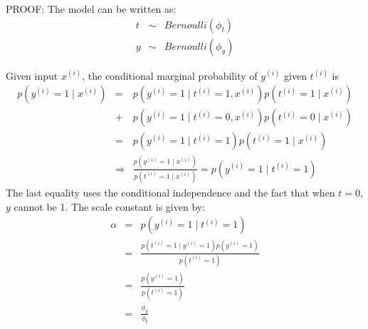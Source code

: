 \begin{answer}

PROOF: The model can be written as:
\begin{eqnarray*}
    t &\sim& Bernoulli(\phi_t) \\
    y &\sim& Bernoulli(\phi_y)
\end{eqnarray*}

Given input $x^{(i)}$, the conditional marginal probability of $y^{(i)}$ given $t^{(i)}$ is
\begin{eqnarray*}
p(y^{(i)} = 1\mid x^{(i)}) 
    &=& p(y^{(i)} = 1 \mid t^{(i)} = 1, x^{(i)}) p(t^{(i)} = 1\mid x^{(i)}) \\
    &+& p(y^{(i)} = 1 \mid t^{(i)} = 0, x^{(i)}) p(t^{(i)} = 0\mid x^{(i)}) \\
    &=& p(y^{(i)} = 1 \mid t^{(i)} = 1) p(t^{(i)} = 1\mid x^{(i)}) \\
    &\Rightarrow& \frac{p(y^{(i)} = 1\mid x^{(i)}) } {p(t^{(i)} = 1\mid x^{(i)})} = p(y^{(i)} = 1 \mid t^{(i)} = 1)
\end{eqnarray*}
The last equality uses the conditional independence and the fact that when $t=0$, $y$ cannot be 1. The scale constant
is given by:
\begin{eqnarray*}
\alpha 
    &=& p(y^{(i)} = 1 \mid t^{(i)} = 1) \\
    &=& \frac{p(t^{(i)} = 1 \mid y^{(i)} = 1) p(y^{(i)} = 1)}{p(t^{(i)} = 1)} \\
    &=& \frac{p(y^{(i)} = 1)}{p(t^{(i)} = 1)} \\
    &=& \frac{\phi_y}{\phi_t} 
\end{eqnarray*}

\end{answer}
